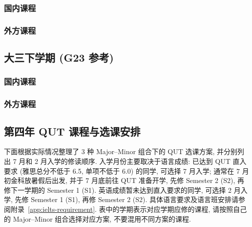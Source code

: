 \documentclass{jit-qut}
\begin{document}
\subsubsection{国内课程}

\subsubsection{外方课程}

\newpage
\subsection{大三下学期 (G23 参考)}

\subsubsection{国内课程}

\subsubsection{外方课程}

\newpage
\subsection{第四年 QUT 课程与选课安排}

下面根据实际情况整理了 3 种 Major--Minor 组合下的 QUT 选课方案, 并分别列出 7 月和 2 月入学的修读顺序. 入学月份主要取决于语言成绩: 已达到 QUT 直入要求 (雅思总分不低于 6.5, 单项不低于 6.0) 的同学, 可选择 7 月入学; 通常在 7 月初金科放暑假后出发, 并于 7 月底前往 QUT 准备开学, 先修 Semester 2 (S2), 再修下一学期的 Semester 1 (S1). 英语成绩暂未达到直入要求的同学, 可选择 2 月入学, 先修 Semester 1 (S1), 再修 Semester 2 (S2). 具体语言要求及语言班安排请参阅附录~\ref{app:ielts-requirement}. 表中的学期表示对应学期应修的课程, 请按照自己的 Major--Minor 组合选择对应方案, 不要混用不同方案的课程.
\end{document}
